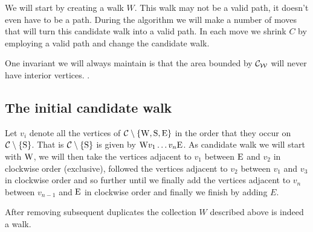 We will start by creating a walk $W$. This walk may not be a valid path, it doesn't even have to be a path. During the algorithm we will make a number of moves that will turn this candidate walk into a valid path. In each move we shrink $C$ by employing a valid path and change the candidate walk.

One invariant we will always maintain is that the area bounded by $\mathcal{C}_{\mathcal{W}}$ will never have interior vertices. .

\subsection{The initial candidate walk}
Let $v_i$ denote all the vertices of $\mathcal{C} \setminus \left\lbrace {\mathrm{W}, \mathrm{S}, \mathrm{E}} \right\rbrace$ in the order that they occur on $\mathcal{C} \setminus \left\lbrace {\mathrm{S}} \right\rbrace$.  That is $\mathcal{C} \setminus \left\lbrace {\mathrm{S}} \right\rbrace$ is given by $\mathrm{W} v_1 \ldots v_n \mathrm{E}$. 
As candidate walk we will start with $\mathrm{W}$, we will then take the vertices adjacent to $v_1$ between $\mathrm{E}$ and $v_2$ in clockwise order (exclusive), followed the vertices adjacent to $v_2$ between $v_1$ and $v_3$ in clockwise order and so further until we finally add the vertices adjacent to $v_n$ between $v_{n-1}$ and $\mathrm{E}$ in clockwise order and finally we finish by adding $E$.

\begin{lemma}
After removing subsequent duplicates the collection $W$ described above is indeed a walk.
\end{lemma}


